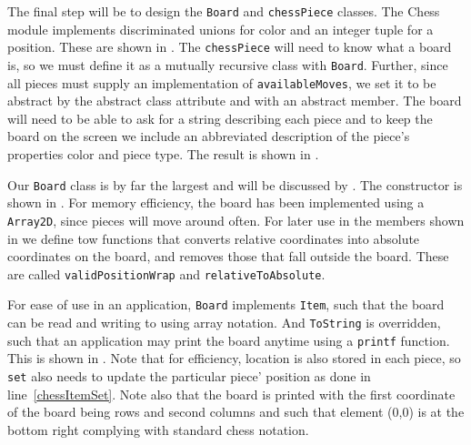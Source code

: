 The final step will be to design the \lstinline{Board} and \lstinline{chessPiece} classes. The Chess module implements discriminated unions for color and an integer tuple for a position. These are shown in .
%
%
The \lstinline{chessPiece} will need to know what a board is, so we must define it as a mutually recursive class with \lstinline{Board}. Further, since all pieces must supply an implementation of \lstinline{availableMoves}, we set it to be abstract by the abstract class attribute and with an abstract member. The board will need to be able to ask for a string describing each piece and to keep the board on the screen we include an abbreviated description of the piece's properties color and piece type. The result is shown in .
%
%

Our \lstinline{Board} class is by far the largest and will be discussed by . The constructor is shown in .
%
%
For memory efficiency, the board has been implemented using a \lstinline{Array2D}, since pieces will move around often. For later use in the members shown in  we define tow functions that converts relative coordinates into absolute coordinates on the board, and removes those that fall outside the board. These are called \lstinline{validPositionWrap} and \lstinline{relativeToAbsolute}.

For ease of use in an application, \lstinline{Board} implements \lstinline{Item}, such that the board can be read and writing to using array notation. And \lstinline{ToString} is overridden, such that an application may print the board anytime using a \lstinline{printf} function. This is shown in .
%
%
Note that for efficiency, location is also stored in each piece, so \lstinline{set} also needs to update the particular piece' position as done in line~\ref{chessItemSet}. Note also that the board is printed with the first coordinate of the board being rows and second columns and such that element (0,0) is at the bottom right complying with standard chess notation.

